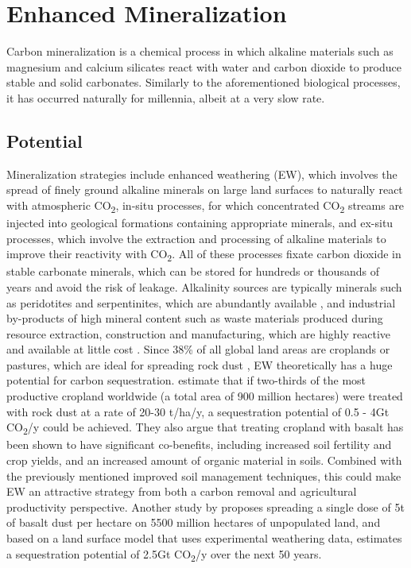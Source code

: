 \section{Enhanced Mineralization}
Carbon mineralization is a chemical process in which alkaline materials such as magnesium and calcium silicates react with water and carbon dioxide to produce stable and solid carbonates. Similarly to the aforementioned biological processes, it has occurred naturally for millennia, albeit at a very slow rate.
\subsection*{Potential}
Mineralization strategies include enhanced weathering (EW), which involves the spread of finely ground alkaline minerals on large land surfaces to naturally react with atmospheric CO\textsubscript{2}, in-situ processes, for which concentrated CO\textsubscript{2} streams are injected into geological formations containing appropriate minerals, and ex-situ processes, which involve the extraction and processing of alkaline materials to improve their reactivity with CO\textsubscript{2}. All of these processes fixate carbon dioxide in stable carbonate minerals, which can be stored for hundreds or thousands of years and avoid the risk of leakage. Alkalinity sources are typically minerals such as peridotites and serpentinites, which are abundantly available \parencite{Lackner1997ProgressSubstrates}, and industrial by-products of high mineral content such as waste materials produced during resource extraction, construction and manufacturing, which are highly reactive and available at little cost \parencite{NRC2015ClimateSequestration}.
Since 38\% of all global land areas are croplands or pastures, which are ideal for spreading rock dust \parencite{Almaraz2022MethodsSettings}, EW theoretically has a huge potential for carbon sequestration. \textcite{Beerling2018FarmingSecurity} estimate that if two-thirds of the most productive cropland worldwide (a total area of 900 million hectares) were treated with rock dust at a rate of 20-30 t/ha/y, a sequestration potential of 0.5 - 4Gt CO\textsubscript{2}/y could be achieved. They also argue that treating cropland with basalt has been shown to have significant co-benefits, including increased soil fertility and crop yields, and an increased amount of organic material in soils. Combined with the previously mentioned improved soil management techniques, this could make EW an attractive strategy from both a carbon removal and agricultural productivity perspective. Another study by \textcite{Goll2021PotentialRock} proposes spreading a single dose of 5t of basalt dust per hectare on 5500 million hectares of unpopulated land, and based on a land surface model that uses experimental weathering data, estimates a sequestration potential of 2.5Gt CO\textsubscript{2}/y over the next 50 years.\\
